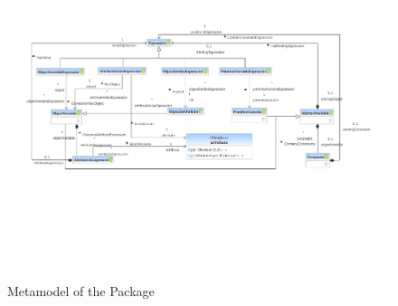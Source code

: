 %
%

\begin{figure}[htbp]
  \centering
  \includegraphics[width=\textheight,angle=90]{figures/A_technical-reference/packages/modeling_patterns_expressions/patterns_expressions}
  \caption{Metamodel of the  Package}
  \label{fig:MM:patterns:expressions}
\end{figure}